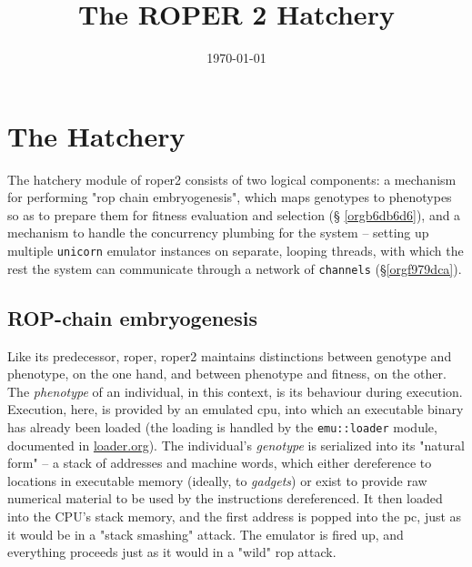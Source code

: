 \documentclass[11pt]{article}
\date{\today}
\title{The ROPER 2 Hatchery}
\begin{document}
\maketitle
\tableofcontents


\section{The Hatchery}
\label{sec:orgc852171}

The hatchery module of \gls{roper2} consists of two logical components: a
mechanism for performing "\gls{rop} chain embryogenesis", which maps genotypes to
phenotypes so as to prepare them for fitness evaluation and selection (\S
\ref{orgb6db6d6}), and a mechanism to handle the concurrency plumbing for the
system -- setting up multiple \texttt{unicorn} emulator instances on separate, looping
threads, with which the rest the system can communicate through a network of
\texttt{channels} (\S \ref{orgf979dca}). 

\subsection{ROP-chain embryogenesis}
\label{sec:org16705ca}
\label{orgb6db6d6}

Like its predecessor, \gls{roper}, \gls{roper2} maintains distinctions between
genotype and phenotype, on the one hand, and between phenotype and fitness,
on the other. The \emph{phenotype} of an individual, in this context, is its
behaviour during execution. Execution, here, is provided by an emulated
\gls{cpu}, into which an executable binary has already been loaded (the
loading is handled by the \texttt{emu::loader} module, documented in \url{loader.org}).
The individual's \emph{genotype} is serialized into its "natural form" -- a
stack of addresses and machine words, which either dereference to locations
in executable memory (ideally, to \emph{gadgets}) or exist to provide raw numerical
material to be used by the instructions dereferenced. It then loaded into
the CPU's stack memory, and the first address is popped into the \gls{pc}, 
just as it would be in a "stack smashing" attack. The emulator is fired up,
and everything proceeds just as it would in a "wild" \gls{rop} attack.  
\end{document}
